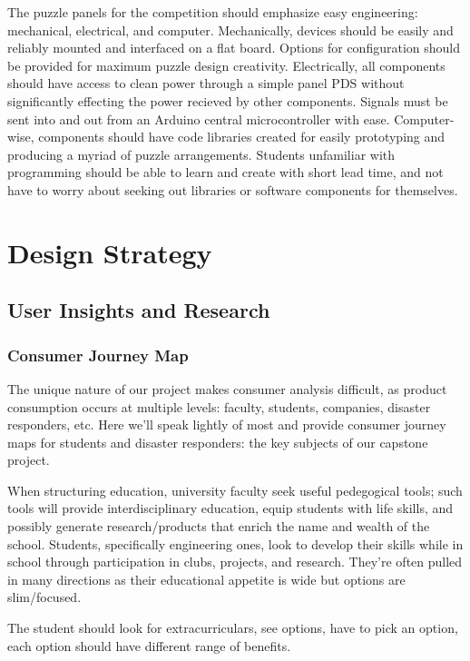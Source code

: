 \documentclass[a4paper, 10pt]{article}
\begin{document}
	The puzzle panels for the competition should emphasize easy engineering: mechanical, electrical, and computer. Mechanically, devices should be easily and reliably mounted and interfaced on a flat board. Options for configuration should be provided for maximum puzzle design creativity. Electrically, all components should have access to clean power through a simple panel PDS without significantly effecting the power recieved by other components. Signals must be sent into and out from an Arduino central microcontroller with ease. Computer-wise, components should have code libraries created for easily prototyping and producing a myriad of puzzle arrangements. Students unfamiliar with programming should be able to learn and create with short lead time, and not have to worry about seeking out libraries or software components for themselves. 
	
\pagebreak

\section{Design Strategy}
	\subsection{User Insights and Research} 
		\subsubsection{Consumer Journey Map}
		The unique nature of our project makes consumer analysis difficult, as product consumption occurs at multiple levels: faculty, students, companies, disaster responders, etc. Here we'll speak lightly of most and provide consumer journey maps for students and disaster responders: the key subjects of our capstone project.
		
		When structuring education, university faculty seek useful pedegogical tools; such tools will provide  interdisciplinary education, equip students with life skills, and possibly generate research/products that enrich the name and wealth of the school. Students, specifically engineering ones, look to develop their skills while in school through participation in clubs, projects, and research. They're often pulled in many directions as their educational appetite is wide but options are slim/focused.
		
		
		The student should look for extracurriculars, see options, have to pick an option, each option should have different range of benefits.
		
\end{document}
